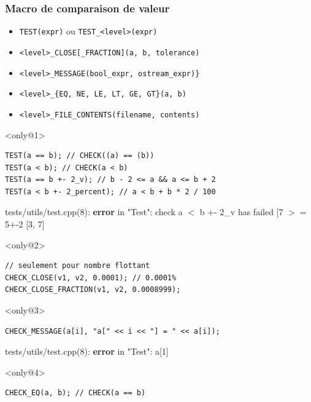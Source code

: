 \documentclass{beamer}
\begin{document}
\begin{frame}[fragile]
\frametitle{Macro de comparaison de valeur}
\begin{itemize}[<+->]
 \item \lstinline|TEST(expr)| ou \lstinline|TEST_<level>(expr)|
 \item \lstinline|<level>_CLOSE[_FRACTION](a, b, tolerance)|
 \item \lstinline|<level>_MESSAGE(bool_expr, ostream_expr)}|
 \item \lstinline|<level>_{EQ, NE, LE, LT, GE, GT}(a, b)|
 \item \lstinline|<level>_FILE_CONTENTS(filename, contents)|
\end{itemize}

\begin{exampleblock}{}<only@1>
\begin{lstlisting}
TEST(a == b); // CHECK((a) == (b))
TEST(a < b); // CHECK(a < b)
TEST(a == b +- 2_v); // b - 2 <= a && a <= b + 2
TEST(a < b +- 2_percent); // a < b + b * 2 / 100
\end{lstlisting}
{\color{f7}tests/utils/test.cpp(8)}: \textbf{\color{f1}error} in "{\color{f5}Test}":
 {\color{f4}check} {\color{f1}a} {\color{f3}$<$} {\color{f1}b +- 2\_v has}
 failed [{\color{f6}7} {\color{f3}$>=$} {\color{f6}5+-2 [3, 7]}
\end{exampleblock}

\begin{exampleblock}{}<only@2>
\begin{lstlisting}
// seulement pour nombre flottant
CHECK_CLOSE(v1, v2, 0.0001); // 0.0001%
CHECK_CLOSE_FRACTION(v1, v2, 0.0008999);
\end{lstlisting}
\end{exampleblock}

\begin{exampleblock}{}<only@3>
\begin{lstlisting}
CHECK_MESSAGE(a[i], "a[" << i << "] = " << a[i]);
\end{lstlisting}
{\color{f7}tests/utils/test.cpp(8)}: \textbf{\color{f1}error} in "{\color{f5}Test}": {\color{f4}a[1]}
\end{exampleblock}

\begin{exampleblock}{}<only@4>
\begin{lstlisting}
CHECK_EQ(a, b); // CHECK(a == b)
\end{lstlisting}
\end{exampleblock}


\end{frame}
\end{document}
